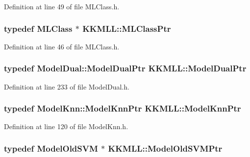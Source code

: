 Definition at line 49 of file M\+L\+Class.\+h.

\subsubsection[{\texorpdfstring{M\+L\+Class\+Ptr}{MLClassPtr}}]{\setlength{\rightskip}{0pt plus 5cm}typedef {\bf M\+L\+Class} $\ast$ {\bf K\+K\+M\+L\+L\+::\+M\+L\+Class\+Ptr}}\hypertarget{namespace_k_k_m_l_l_ac272393853d59e72e8456f14cd6d8c23}{}\label{namespace_k_k_m_l_l_ac272393853d59e72e8456f14cd6d8c23}


Definition at line 46 of file M\+L\+Class.\+h.

\subsubsection[{\texorpdfstring{Model\+Dual\+Ptr}{ModelDualPtr}}]{\setlength{\rightskip}{0pt plus 5cm}typedef {\bf Model\+Dual\+::\+Model\+Dual\+Ptr} {\bf K\+K\+M\+L\+L\+::\+Model\+Dual\+Ptr}}\hypertarget{namespace_k_k_m_l_l_a77902c7a85875707f89899d491b84971}{}\label{namespace_k_k_m_l_l_a77902c7a85875707f89899d491b84971}


Definition at line 233 of file Model\+Dual.\+h.

\subsubsection[{\texorpdfstring{Model\+Knn\+Ptr}{ModelKnnPtr}}]{\setlength{\rightskip}{0pt plus 5cm}typedef {\bf Model\+Knn\+::\+Model\+Knn\+Ptr} {\bf K\+K\+M\+L\+L\+::\+Model\+Knn\+Ptr}}\hypertarget{namespace_k_k_m_l_l_af6bef26247ab1e5e6f2460f22dc5b65e}{}\label{namespace_k_k_m_l_l_af6bef26247ab1e5e6f2460f22dc5b65e}


Definition at line 120 of file Model\+Knn.\+h.

\subsubsection[{\texorpdfstring{Model\+Old\+S\+V\+M\+Ptr}{ModelOldSVMPtr}}]{\setlength{\rightskip}{0pt plus 5cm}typedef {\bf Model\+Old\+S\+VM} $\ast$ {\bf K\+K\+M\+L\+L\+::\+Model\+Old\+S\+V\+M\+Ptr}}\hypertarget{namespace_k_k_m_l_l_ab771fc915ce1e4f2c938a942923ad8b7}{}\label{namespace_k_k_m_l_l_ab771fc915ce1e4f2c938a942923ad8b7}


